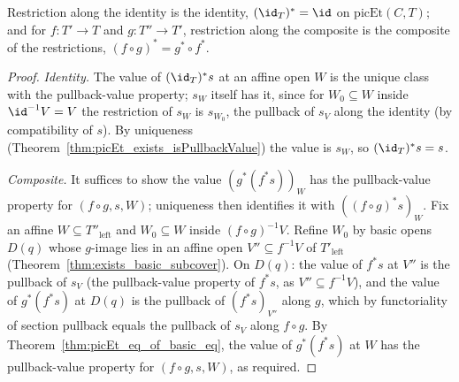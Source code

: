 \begin{theorem}
  \label{thm:picEtMap_functor_laws}
  \leanok
  Restriction along the identity is the identity, \((\id_T)^{*} = \id\) on \(\mathrm{picEt}(C, T)\);
  and for \(f \colon T' \to T\) and \(g \colon T'' \to T'\), restriction along the composite is the
  composite of the restrictions, \((f \circ g)^{*} = g^{*} \circ f^{*}\).
\end{theorem}
\begin{proof}
  \leanok
  \emph{Identity.} The value of \((\id_T)^{*}s\) at an affine open \(W\) is the unique class with
  the pullback-value property; \(s_W\) itself has it, since for \(W_0 \subseteq W\) inside
  \(\id^{-1}V = V\) the restriction of \(s_W\) is \(s_{W_0}\), the pullback of \(s_V\) along the
  identity (by compatibility of \(s\)). By uniqueness (Theorem~\ref{thm:picEt_exists_isPullbackValue})
  the value is \(s_W\), so \((\id_T)^{*}s = s\).

  \emph{Composite.} It suffices to show the value \((g^{*}(f^{*}s))_W\) has the pullback-value
  property for \((f \circ g, s, W)\); uniqueness then identifies it with \(((f \circ g)^{*}s)_W\).
  Fix an affine \(W \subseteq T''_{\mathrm{left}}\) and \(W_0 \subseteq W\) inside
  \((f \circ g)^{-1}V\). Refine \(W_0\) by basic opens \(D(q)\) whose \(g\)-image lies in an affine
  open \(V'' \subseteq f^{-1}V\) of \(T'_{\mathrm{left}}\)
  (Theorem~\ref{thm:exists_basic_subcover}). On \(D(q)\): the value of \(f^{*}s\) at \(V''\) is the
  pullback of \(s_V\) (the pullback-value property of \(f^{*}s\), as \(V'' \subseteq f^{-1}V\)), and
  the value of \(g^{*}(f^{*}s)\) at \(D(q)\) is the pullback of \((f^{*}s)_{V''}\) along \(g\), which
  by functoriality of section pullback equals the pullback of \(s_V\) along \(f \circ g\). By
  Theorem~\ref{thm:picEt_eq_of_basic_eq}, the value of \(g^{*}(f^{*}s)\) at \(W\) has the
  pullback-value property for \((f \circ g, s, W)\), as required.
\end{proof}

